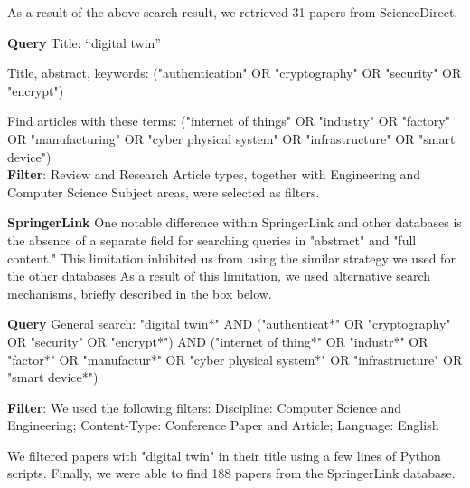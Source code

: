 As a result of the above search result, we retrieved 31 papers from ScienceDirect. 

\begin{tcolorbox}[colback=black!5!white, sharp corners=all, colframe=white!95!black]
\textbf{Query}
\tcblower
Title: “digital twin”

Title, abstract, keywords: ("authentication" OR "cryptography" OR "security" OR "encrypt")

Find articles with these terms: ("internet of things" OR "industry" OR "factory" OR "manufacturing" OR "cyber physical system" OR "infrastructure" OR "smart device")
\\

\textbf{Filter}: Review and Research Article types, together with Engineering and Computer Science Subject areas, were selected as filters.

\end{tcolorbox}


\textbf{SpringerLink}
One notable difference within SpringerLink and other databases is the absence of a separate field for searching queries in "abstract" and "full content." This limitation inhibited us from using the similar strategy we used for the other databases 
As a result of this limitation, we used alternative search mechanisms, briefly described in the box below.

\begin{tcolorbox}[colback=black!5!white, sharp corners=all, colframe=white!95!black]
\textbf{Query}
General search: "digital twin*" AND ("authenticat*" OR "cryptography" OR "security" OR "encrypt*") AND ("internet of thing*" OR "industr*" OR "factor*" OR "manufactur*" OR "cyber physical system*" OR "infrastructure" OR "smart device*") 

\tcblower
\textbf{Filter}: We used the following filters: Discipline: Computer Science and Engineering; Content-Type: Conference Paper and Article; Language: English

We filtered papers with "digital twin" in their title using a few lines of Python scripts. Finally, we were able to find 188 papers from the SpringerLink database.

\end{tcolorbox}
